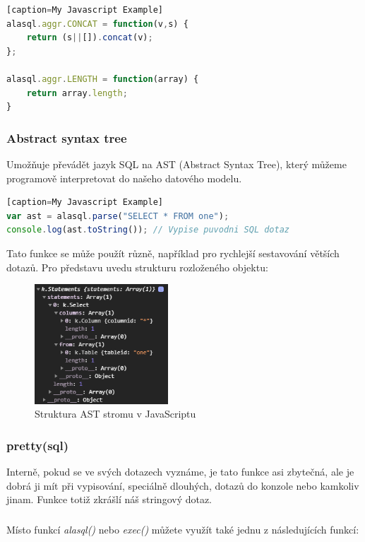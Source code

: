 \documentclass[a4, titlepage]{article}
\begin{document}
\begin{lstlisting}[language=JavaScript][caption=My Javascript Example]
alasql.aggr.CONCAT = function(v,s) {
    return (s||[]).concat(v);
};

alasql.aggr.LENGTH = function(array) {
	return array.length;
}
\end{lstlisting}

\subsubsection*{Abstract syntax tree}
Umožňuje převádět jazyk SQL na AST (Abstract Syntax Tree), který můžeme programově interpretovat do našeho datového modelu.

\begin{lstlisting}[language=JavaScript][caption=My Javascript Example]
var ast = alasql.parse("SELECT * FROM one");
console.log(ast.toString()); // Vypise puvodni SQL dotaz
\end{lstlisting}
Tato funkce se může použít různě, například pro rychlejší sestavování větších dotazů. Pro představu uvedu strukturu rozloženého objektu:
\begin{figure}[h]
    \centering
    \includegraphics[width=5cm]{astObj}
    \caption{Struktura AST stromu v JavaScriptu}
\end{figure} 

\subsubsection*{pretty(sql)}
Interně, pokud se ve svých dotazech vyznáme, je tato funkce asi zbytečná, ale je dobrá ji mít při vypisování, speciálně dlouhých, dotazů do konzole nebo kamkoliv jinam. Funkce totiž zkrášlí náš stringový dotaz.

\subsubsection*{}
Místo funkcí \textit{alasql()} nebo \textit{exec()} můžete využít také jednu z následujících funkcí:
\end{document}
